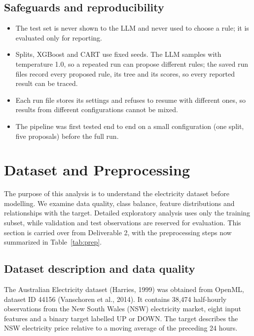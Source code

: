 \documentclass[11pt]{article}
\begin{document}
\subsection{Safeguards and reproducibility}
\begin{itemize}
  \item The test set is never shown to the LLM and never used to choose a rule; it is evaluated
        only for reporting.
  \item Splits, XGBoost and CART use fixed seeds. The LLM samples with temperature 1.0, so a repeated
        run can propose different rules; the saved run files record every proposed rule, its tree and
        its scores, so every reported result can be traced.
  \item Each run file stores its settings and refuses to resume with different ones, so results
        from different configurations cannot be mixed.
  \item The pipeline was first tested end to end on a small
        configuration (one split, five proposals) before the full run.
\end{itemize}

\section{Dataset and Preprocessing}\label{sec:data}

The purpose of this analysis is to understand the electricity dataset before modelling. We examine
data quality, class balance, feature distributions and relationships with the target. Detailed
exploratory analysis uses only the training subset, while validation and test observations are
reserved for evaluation. This section is carried over from Deliverable 2, with the preprocessing
steps now summarized in Table~\ref{tab:prep}.

\subsection{Dataset description and data quality}

The Australian Electricity dataset (Harries, 1999) was obtained from OpenML, dataset ID 44156
(Vanschoren et al., 2014). It contains 38,474 half-hourly observations from the New South Wales (NSW)
electricity market, eight input features and a binary target labelled UP or DOWN. The target
describes the NSW electricity price relative to a moving average of the preceding 24 hours.
\end{document}
